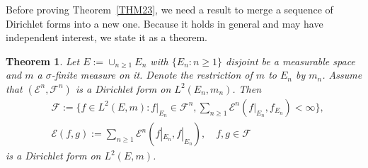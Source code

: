 \documentclass[a4paper]{amsart}
\newtheorem{theorem}{Theorem}[section]
\theoremstyle{definition}
\theoremstyle{remark}
\numberwithin{equation}{section}
\begin{document}
Before proving Theorem~\ref{THM23}, we need a result to merge a sequence of Dirichlet forms into a new one.
Because it holds in general and may have independent interest, we state it as a theorem.
\begin{theorem}\label{LM28}
Let $E:=\cup_{n\geq 1}E_n$ with $\{E_n:n\geq 1\}$ disjoint be a measurable space and $m$ a $\sigma$-finite measure on it. Denote the restriction of $m$ to $E_n$ by $m_n$. Assume that $({{\mathcal{E}}}^n,{{\mathcal{F}}}^n)$ is a Dirichlet form on $L^2(E_n,m_n)$. Then
\begin{equation}\label{EQ2FFLE}
\begin{aligned}
	&{{\mathcal{F}}}:=\{f\in L^2(E,m): f|_{E_n}\in {{\mathcal{F}}}^n, \sum_{n\geq 1}{{\mathcal{E}}}^n(f|_{E_n},f_{E_n})<\infty\}, \\
	&{{\mathcal{E}}}(f,g):= \sum_{n\geq 1}{{\mathcal{E}}}^n(f|_{E_n}, f|_{E_n}),\quad f,g\in {{\mathcal{F}}}
\end{aligned}
\end{equation}
is a Dirichlet form on $L^2(E,m)$.
\end{theorem}
\end{document}
